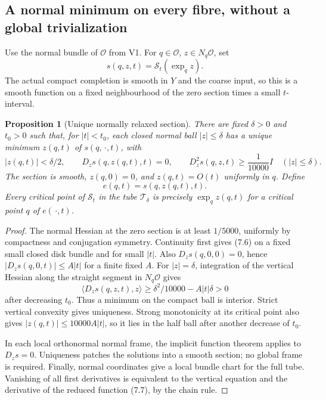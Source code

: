 \documentclass[11pt,oneside]{article}
\newtheorem{proposition}[theorem]{Proposition}
\newcommand{\cS}{\mathcal S}
\newcommand{\cO}{\mathcal O}
\newcommand{\cT}{\mathcal T}
\begin{document}
\subsection{A normal minimum on every fibre, without a global trivialization}

Use the normal bundle of \(\cO\) from
V1. For \(q\in\cO\), \(z\in N_q\cO\),
set
\[
                  s(q,z,t)=\cS_t(\exp_qz).
 \tag{7.5}
\]
The actual compact completion is smooth
in \(Y\) and the coarse input, so this
is a smooth function on a fixed
neighbourhood of the zero section
times a small \(t\)-interval.

\begin{proposition}[Unique normally relaxed section]
\label{prop:f13v2-normal}
There are fixed \(\delta>0\) and
\(t_0>0\) such that, for \(|t|<t_0\),
each closed normal ball \(|z|\le\delta\)
has a unique minimum \(z(q,t)\) of
\(s(q,\,\cdot,t)\), with
\[
 |z(q,t)|<\delta/2,\qquad
 D_zs(q,z(q,t),t)=0,\qquad
 D_z^2s(q,z,t)\ge\frac1{10000}I
                    \quad(|z|\le\delta).
 \tag{7.6}
\]
The section is smooth, \(z(q,0)=0\),
and \(z(q,t)=O(t)\) uniformly in \(q\).
Define
\[
 e(q,t)=s(q,z(q,t),t).
 \tag{7.7}
\]
Every critical point of \(\cS_t\)
in the tube \(\cT_\delta\) is precisely
\(\exp_qz(q,t)\) for a critical
point \(q\) of \(e(\,\cdot,t)\).
\end{proposition}
\begin{proof}
The normal Hessian at the zero section
is at least \(1/5000\), uniformly by
compactness and conjugation symmetry.
Continuity first gives (7.6) on
a fixed small closed disk bundle
and for small \(|t|\).
Also \(D_zs(q,0,0)=0\), hence
\(|D_zs(q,0,t)|\le A|t|\) for
a finite fixed \(A\).
For \(|z|=\delta\), integration
of the vertical Hessian along the
straight segment in \(N_q\cO\) gives
\[
 \langle D_zs(q,z,t),z\rangle
       \ge\delta^2/10000-A|t|\delta>0
 \tag{7.8}
\]
after decreasing \(t_0\).
Thus a minimum on the compact ball
is interior. Strict vertical convexity
gives uniqueness. Strong monotonicity
at its critical point also gives
\(|z(q,t)|\le10000A|t|\), so it lies
in the half ball after another
decrease of \(t_0\).

In each local orthonormal normal frame,
the implicit function theorem applies
to \(D_zs=0\). Uniqueness patches the
solutions into a smooth section;
no global frame is required. Finally,
normal coordinates give a local
bundle chart for the full tube.
Vanishing of all first derivatives
is equivalent to the vertical
equation and the derivative of
the reduced function (7.7), by
the chain rule.
\end{proof}
\end{document}
